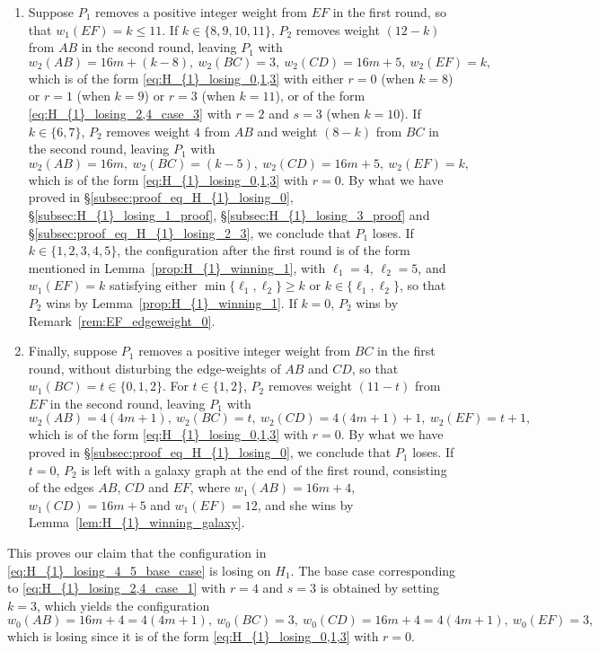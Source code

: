 \documentclass[11pt,reqno]{amsart}
\theoremstyle{definition}
\theoremstyle{definition}
\begin{document}
\begin{enumerate}
\item Suppose $P_{1}$ removes a positive integer weight from $EF$ in the first round, so that $w_{1}(EF)=k \leqslant 11$. If $k \in \{8,9,10,11\}$, $P_{2}$ removes weight $(12-k)$ from $AB$ in the second round, leaving $P_{1}$ with 
\begin{equation}
w_{2}(AB)=16m+(k-8),\ w_{2}(BC)=3,\ w_{2}(CD)=16m+5,\ w_{2}(EF)=k,\nonumber
\end{equation}
which is of the form \eqref{eq:H_{1}_losing_0,1,3} with either $r=0$ (when $k=8$) or $r=1$ (when $k=9$) or $r=3$ (when $k=11$), or of the form \eqref{eq:H_{1}_losing_2,4_case_3} with $r=2$ and $s=3$ (when $k=10$). If $k\in\{6,7\}$, $P_{2}$ removes weight $4$ from $AB$ and weight $(8-k)$ from $BC$ in the second round, leaving $P_{1}$ with 
\begin{equation}
w_{2}(AB)=16m,\ w_{2}(BC)=(k-5),\ w_{2}(CD)=16m+5,\ w_{2}(EF)=k,\nonumber
\end{equation}
which is of the form \eqref{eq:H_{1}_losing_0,1,3} with $r=0$. By what we have proved in \S\ref{subsec:proof_eq_H_{1}_losing_0}, \S\ref{subsec:H_{1}_losing_1_proof}, \S\ref{subsec:H_{1}_losing_3_proof} and \S\ref{subsec:proof_eq_H_{1}_losing_2_3}, we conclude that $P_{1}$ loses. If $k \in \{1,2,3,4,5\}$, the configuration after the first round is of the form mentioned in Lemma~\ref{prop:H_{1}_winning_1}, with $\ell_{1}=4$, $\ell_{2}=5$, and $w_{1}(EF)=k$ satisfying either $\min\{\ell_{1},\ell_{2}\}\geqslant k$ or $k \in\{\ell_{1},\ell_{2}\}$, so that $P_{2}$ wins by Lemma~\ref{prop:H_{1}_winning_1}. If $k=0$, $P_{2}$ wins by Remark~\ref{rem:EF_edgeweight_0}.

\item Finally, suppose $P_{1}$ removes a positive integer weight from $BC$ in the first round, without disturbing the edge-weights of $AB$ and $CD$, so that $w_{1}(BC)=t\in\{0,1,2\}$. For $t\in\{1,2\}$, $P_{2}$ removes weight $(11-t)$ from $EF$ in the second round, leaving $P_{1}$ with
\begin{equation}
w_{2}(AB)=4(4m+1),\ w_{2}(BC)=t,\ w_{2}(CD)=4(4m+1)+1,\ w_{2}(EF)=t+1,\nonumber
\end{equation}
which is of the form \eqref{eq:H_{1}_losing_0,1,3} with $r=0$. By what we have proved in \S\ref{subsec:proof_eq_H_{1}_losing_0}, we conclude that $P_{1}$ loses. If $t=0$, $P_{2}$ is left with a galaxy graph at the end of the first round, consisting of the edges $AB$, $CD$ and $EF$, where $w_{1}(AB)=16m+4$, $w_{1}(CD)=16m+5$ and $w_{1}(EF)=12$, and she wins by Lemma~\ref{lem:H_{1}_winning_galaxy}.
\end{enumerate}
This proves our claim that the configuration in \eqref{eq:H_{1}_losing_4_5_base_case} is losing on $H_{1}$. The base case corresponding to \eqref{eq:H_{1}_losing_2,4_case_1} with $r=4$ and $s=3$ is obtained by setting $k=3$, which yields the configuration 
\begin{equation}
w_{0}(AB)=16m+4=4(4m+1),\ w_{0}(BC)=3,\ w_{0}(CD)=16m+4=4(4m+1),\ w_{0}(EF)=3,\nonumber
\end{equation}
which is losing since it is of the form \eqref{eq:H_{1}_losing_0,1,3} with $r=0$.
\end{document}
